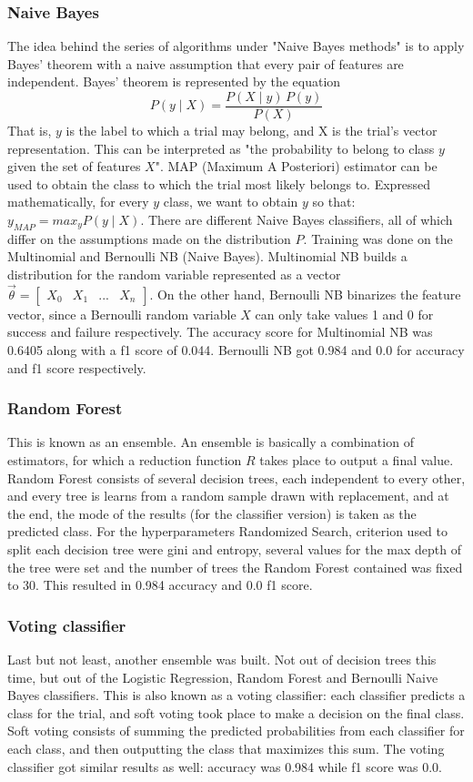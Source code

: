 \documentclass{article}
\begin{document}
		\subsubsection{Naive Bayes}
			The idea behind the series of algorithms under "Naive Bayes methods" is to apply Bayes' theorem with a naive assumption that every pair of features are independent. Bayes' theorem is represented by the equation $$ P(y \mid X) = \frac{P(X \mid y) \, P(y)}{P(X)} $$That is, $y$ is the label to which a trial may belong, and X is the trial's vector representation. This can be interpreted as "the probability to belong to class $y$ given the set of features $X$". MAP (Maximum A Posteriori) estimator can be used to obtain the class to which the trial most likely belongs to. Expressed mathematically, for every $y$ class, we want to obtain $y$ so that: $y_{MAP} = max_y P(y \mid X)$. There are different Naive Bayes classifiers, all of which differ on the assumptions made on the distribution $P$. Training was done on the Multinomial and Bernoulli NB (Naive Bayes). Multinomial NB builds a distribution for the random variable represented as a vector $\vec{\theta} = \begin{bmatrix}
         X_{0} & X_{1} & ... & X_{n}
        \end{bmatrix}$. On the other hand, Bernoulli NB binarizes the feature vector, since a Bernoulli random variable $X$ can only take values 1 and 0 for success and failure respectively. The accuracy score for Multinomial NB was 0.6405 along with a f1 score of 0.044. Bernoulli NB got 0.984 and 0.0 for accuracy and f1 score respectively.
		\subsubsection{Random Forest}
			This is known as an ensemble. An ensemble is basically a combination of estimators, for which a reduction function $R$ takes place to output a final value. Random Forest consists of several decision trees, each independent to every other, and every tree is learns from a random sample drawn with replacement, and at the end, the mode of the results (for the classifier version) is taken as the predicted class. For the hyperparameters Randomized Search, criterion used to split each decision tree were gini and entropy, several values for the max depth of the tree were set and the number of trees the Random Forest contained was fixed to 30. This resulted in 0.984 accuracy and 0.0 f1 score.
		\subsubsection{Voting classifier}
			Last but not least, another ensemble was built. Not out of decision trees this time, but out of the Logistic Regression, Random Forest and Bernoulli Naive Bayes classifiers. This is also known as a voting classifier: each classifier predicts a class for the trial, and soft voting took place to make a decision on the final class. Soft voting consists of summing the predicted probabilities from each classifier for each class, and then outputting the class that maximizes this sum. The voting classifier got similar results as well: accuracy was 0.984 while f1 score was 0.0.
\end{document}
